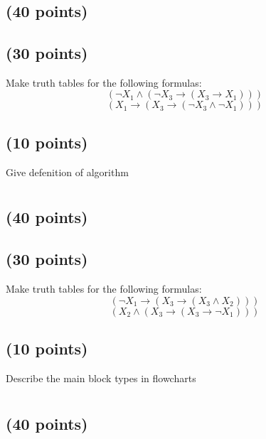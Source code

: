 \documentclass[a4paper,10pt]{article}
\begin{document}
\section{}
\subsection{(40 points)}


\subsection{(30 points)}
 Make truth tables for the following formulas:
\[
(\neg X_{1} \wedge (\neg X_{3} \rightarrow (X_{3} \rightarrow X_{1})))
\]
\[
(X_{1} \rightarrow (X_{3} \rightarrow (\neg X_{3} \wedge \neg X_{1})))
\]

\subsection{(10 points)}
Give defenition of algorithm

\newpage

\section{}
\subsection{(40 points)}


\subsection{(30 points)}
 Make truth tables for the following formulas:
\[
(\neg X_{1} \rightarrow (X_{3} \rightarrow (X_{3} \wedge X_{2})))
\]
\[
(X_{2} \wedge (X_{3} \rightarrow (X_{3} \rightarrow \neg X_{1})))
\]

\subsection{(10 points)}
Describe the main block types in flowcharts

\newpage

\section{}
\subsection{(40 points)}

\end{document}

